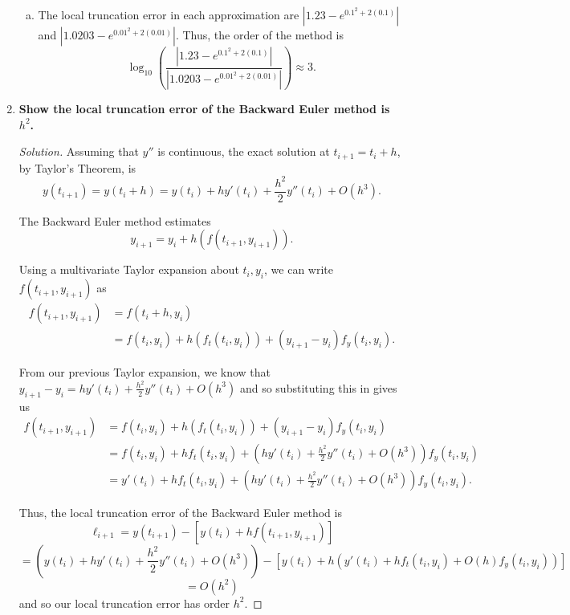 \documentclass[11pt]{article}
\newenvironment{solution}
  {\renewcommand\qedsymbol{$\blacksquare$}\begin{proof}[Solution]}
  {\end{proof}}
\theoremstyle{definition}
\begin{document}
\begin{enumerate}
\begin{enumerate}[a)]
        \item The local truncation error in each approximation are $\left|1.23 - e^{0.1^2 + 2(0.1)}\right|$ and $\left|1.0203 - e^{0.01^2 + 2(0.01)} \right|.$ 
         Thus, the order of the method is \[ \log_{10} \left( \frac{\left|1.23 - e^{0.1^2 + 2(0.1)}\right|}{\left|1.0203 - e^{0.01^2 + 2(0.01)} \right|} \right) \approx \boxed{3}. \]
    \end{enumerate}

    \newpage

    \item \textbf{Show the local truncation error of the Backward Euler method is $h^2$.}
    
    \begin{solution}
    Assuming that $y''$ is continuous, the exact solution at $t_{i+1} = t_i + h$, by Taylor's Theorem, is
    \[ y(t_{i+1}) = y(t_i + h) = y(t_i) + hy'(t_i) + \frac{h^2}{2}y''(t_i) + O(h^3). \]

    The Backward Euler method estimates \[y_{i+1} = y_i + h(f(t_{i+1}, y_{i+1})).\]

    Using a multivariate Taylor expansion about $t_i, y_i$, we can write $f(t_{i+1}, y_{i+1})$ as
    \begin{align*} f(t_{i+1}, y_{i+1}) &= f(t_i + h, y_i) \\
        &= f(t_i, y_i) + h(f_t(t_i, y_i)) + (y_{i+1} - y_i)f_y(t_i, y_i).
    \end{align*}

    From our previous Taylor expansion, we know that $y_{i+1} - y_{i} = hy'(t_i) + \frac{h^2}{2}y''(t_i) + O(h^3)$ and so substituting this in gives us
    \begin{align*} f(t_{i+1}, y_{i+1}) &= f(t_i, y_i) + h(f_t(t_i, y_i)) + (y_{i+1} - y_i)f_y(t_i, y_i) \\
    &= f(t_i, y_i) + hf_t(t_i, y_i) + \left(hy'(t_i) + \frac{h^2}{2}y''(t_i) + O(h^3)\right)f_y(t_i, y_i) \\
    &= y'(t_i) + hf_t(t_i, y_i) + \left(hy'(t_i) + \frac{h^2}{2}y''(t_i) + O(h^3)\right)f_y(t_i, y_i).
    \end{align*}

    Thus, the local truncation error of the Backward Euler method is
    \[ \ell_{i+1} = y(t_{i+1}) - [y(t_i) + hf(t_{i+1}, y_{i+1})] \]
    \[ = \left( y(t_i) + hy'(t_i) + \frac{h^2}{2}y''(t_i) + O(h^3) \right) - \left[ y(t_i) + h\left(y'(t_i) + hf_t(t_i, y_i) + O(h) f_y(t_i, y_i)\right) \right] \]
    \[ = O(h^2) \]
    and so our local truncation error has order $h^2$.
    \end{solution}



\end{enumerate}
\end{document}
